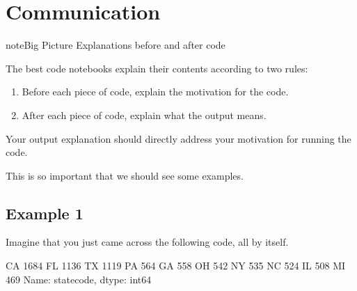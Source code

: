 \documentclass[letterpaper,10pt,english]{jupyterBook}
\begin{document}
\section{Communication}
\label{\detokenize{chapter-5-before-and-after:communication}}
\begin{sphinxadmonition}{note}{Big Picture \sphinxhyphen{} Explanations before and after code}

\sphinxAtStartPar
The best code notebooks explain their contents according to two rules:
\begin{enumerate}
%
\item {} 
\sphinxAtStartPar
Before each piece of code, explain the motivation for the code.

\item {} 
\sphinxAtStartPar
After each piece of code, explain what the output means.

\end{enumerate}

\sphinxAtStartPar
{} Your output explanation should directly address your motivation for running the code.
\end{sphinxadmonition}

\sphinxAtStartPar
This is so important that we should see some examples.


\subsection{Example 1}
\label{\detokenize{chapter-5-before-and-after:example-1}}
\sphinxAtStartPar
Imagine that you just came across the following code, all by itself.

\begin{sphinxVerbatim}[commandchars=\\\{\}]
\PYG{p}{[}\PYG{p}{]}  
\end{sphinxVerbatim}

\begin{sphinxVerbatim}[commandchars=\\\{\}]
CA    1684
FL    1136
TX    1119
PA     564
GA     558
OH     542
NY     535
NC     524
IL     508
MI     469
Name: state\PYGZus{}code, dtype: int64
\end{sphinxVerbatim}
\end{document}
